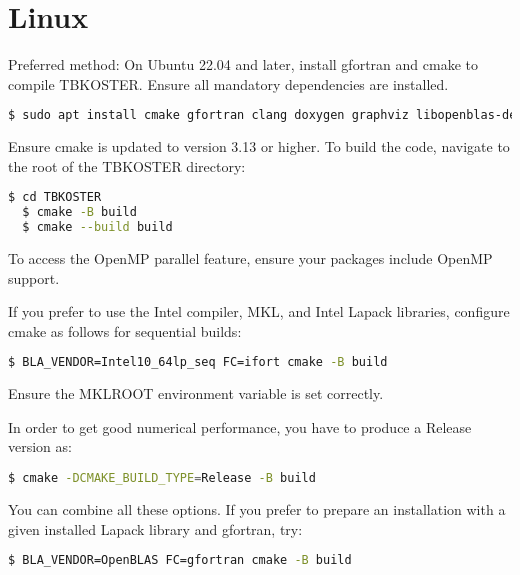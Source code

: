 \documentclass[12pt, onecolumn]{memoir}
\begin{document}
\section{Linux}
Preferred method: On Ubuntu 22.04 and later, install gfortran and cmake to compile TBKOSTER. Ensure all mandatory dependencies are installed.
\begin{lstlisting}[language=sh,basicstyle=\small\ttfamily,frame=single,breaklines=true]
$ sudo apt install cmake gfortran clang doxygen graphviz libopenblas-dev libomp-dev texlive-latex-base texlive-latex-extra texlive-bibtex-extra tex4ht biber
\end{lstlisting}
Ensure cmake is updated to version 3.13 or higher.
To build the code, navigate to the root of the TBKOSTER directory:
\begin{lstlisting}[language=sh,basicstyle=\small\ttfamily,frame=single]
  $ cd TBKOSTER
  $ cmake -B build
  $ cmake --build build
\end{lstlisting}
To access the OpenMP parallel feature, ensure your packages include OpenMP support.

If you prefer to use the Intel compiler, MKL, and Intel Lapack libraries, configure cmake as follows for sequential builds:
\begin{lstlisting}[language=sh,basicstyle=\small\ttfamily]
$ BLA_VENDOR=Intel10_64lp_seq FC=ifort cmake -B build
\end{lstlisting}
Ensure the MKLROOT environment variable is set correctly.

In order to get good numerical performance, you have to produce a Release version as:
\begin{lstlisting}[language=sh,basicstyle=\small\ttfamily]
$ cmake -DCMAKE_BUILD_TYPE=Release -B build
\end{lstlisting}
You can combine all these options.
If you prefer to prepare an installation with a given installed Lapack library and gfortran, try:
\begin{lstlisting}[language=sh,basicstyle=\small\ttfamily]
$ BLA_VENDOR=OpenBLAS FC=gfortran cmake -B build
\end{lstlisting}
\end{document}
